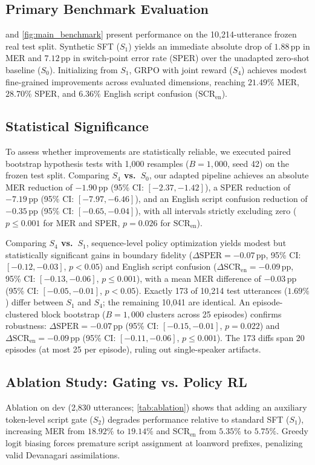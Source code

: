 \documentclass[10pt,twocolumn,a4paper]{article}
\newcommand{\sys}[1]{$S_{#1}$}
\newcommand{\pp}{\,\text{pp}}
\newcommand{\SCRen}{\text{SCR}_{\text{en}}}
\begin{document}
\subsection{Primary Benchmark Evaluation}
 and \cref{fig:main_benchmark} present performance on the 10,214-utterance frozen real test split. Synthetic SFT (\sys{1}) yields an immediate absolute drop of $1.88\pp$ in MER and $7.12\pp$ in switch-point error rate (SPER) over the unadapted zero-shot baseline (\sys{0}). Initializing from \sys{1}, GRPO with joint reward (\sys{4}) achieves modest fine-grained improvements across evaluated dimensions, reaching $21.49\%$ MER, $28.70\%$ SPER, and $6.36\%$ English script confusion ($\SCRen$).

\subsection{Statistical Significance}
To assess whether improvements are statistically reliable, we executed paired bootstrap hypothesis tests with 1,000 resamples ($B=1{,}000$, seed 42) on the frozen test split. Comparing \textbf{\sys{4} vs.\ \sys{0}}, our adapted pipeline achieves an absolute MER reduction of $-1.90\pp$ (95\% CI: $[-2.37, -1.42]$), a SPER reduction of $-7.19\pp$ (95\% CI: $[-7.97, -6.46]$), and an English script confusion reduction of $-0.35\pp$ (95\% CI: $[-0.65, -0.04]$), with all intervals strictly excluding zero ($p \le 0.001$ for MER and SPER, $p = 0.026$ for $\SCRen$). 

Comparing \textbf{\sys{4} vs.\ \sys{1}}, sequence-level policy optimization yields modest but statistically significant gains in boundary fidelity ($\Delta \text{SPER} = -0.07\pp$, 95\% CI: $[-0.12, -0.03]$, $p < 0.05$) and English script confusion ($\Delta \SCRen = -0.09\pp$, 95\% CI: $[-0.13, -0.06]$, $p \le 0.001$), with a mean MER difference of $-0.03\pp$ (95\% CI: $[-0.05, -0.01]$, $p < 0.05$). Exactly 173 of 10,214 test utterances ($1.69\%$) differ between \sys{1} and \sys{4}; the remaining 10,041 are identical. An episode-clustered block bootstrap ($B=1{,}000$ clusters across 25 episodes) confirms robustness: $\Delta \text{SPER} = -0.07\pp$ (95\% CI: $[-0.15, -0.01]$, $p = 0.022$) and $\Delta \SCRen = -0.09\pp$ (95\% CI: $[-0.11, -0.06]$, $p \le 0.001$). The 173 diffs span 20 episodes (at most 25 per episode), ruling out single-speaker artifacts.

\subsection{Ablation Study: Gating vs. Policy RL}
Ablation on dev (2,830 utterances; \cref{tab:ablation}) shows that adding an auxiliary token-level script gate (\sys{2}) degrades performance relative to standard SFT (\sys{1}), increasing MER from $18.92\%$ to $19.14\%$ and $\SCRen$ from $5.35\%$ to $5.75\%$. Greedy logit biasing forces premature script assignment at loanword prefixes, penalizing valid Devanagari assimilations.
\end{document}
